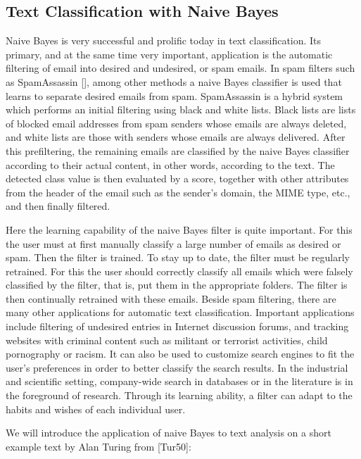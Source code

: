\documentclass[10pt]{book}
\begin{document}
\subsection{Text Classification with Naive Bayes}
Naive Bayes is very successful and prolific today in text classification. Its primary, and at the same time very important, application is the automatic filtering of email into desired and undesired, or spam emails. In spam filters such as SpamAssassin [\cite{schwartz2004spamassassin}], among other methods a naive Bayes classifier is used that learns to separate desired emails from spam. SpamAssassin is a hybrid system which performs an initial filtering using black and white lists. Black lists are lists of blocked email addresses from spam senders whose emails are always deleted, and white lists are those with senders whose emails are always delivered. After this prefiltering, the remaining emails are classified by the naive Bayes classifier according to their actual content, in other words, according to the text. The detected class value is then evaluated by a score, together with other attributes from the header of the email such as the sender's domain, the MIME type, etc., and then finally filtered.

Here the learning capability of the naive Bayes filter is quite important. For this the user must at first manually classify a large number of emails as desired or spam. Then the filter is trained. To stay up to date, the filter must be regularly retrained. For this the user should correctly classify all emails which were falsely classified by the filter, that is, put them in the appropriate folders. The filter is then continually retrained with these emails.
Beside spam filtering, there are many other applications for automatic text classification. Important applications include filtering of undesired entries in Internet discussion forums, and tracking websites with criminal content such as militant or terrorist activities, child pornography or racism. It can also be used to customize search engines to fit the user's preferences in order to better classify the search results. In the industrial and scientific setting, company-wide search in databases or in the literature is in the foreground of research. Through its learning ability, a filter can adapt to the habits and wishes of each individual user.

We will introduce the application of naive Bayes to text analysis on a short example text by Alan Turing from [Tur50]:
\end{document}
